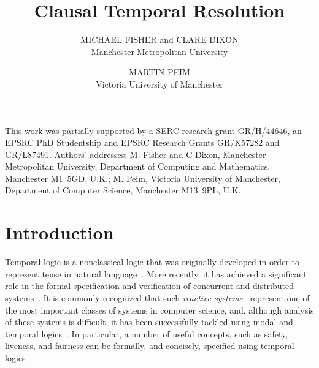 \documentclass[nohyperref]{acmtrans2f}
\title{Clausal Temporal Resolution}
\author{MICHAEL FISHER and CLARE DIXON\\
        Manchester Metropolitan University
        \and
        MARTIN PEIM\\
        Victoria University of Manchester}
\begin{document}
\begin{bottomstuff}
This  work was  partially supported by a SERC research grant GR/H/44646, an
EPSRC PhD Studentship and EPSRC Research Grants GR/K57282 and GR/L87491.\newline
%
Authors' addresses: M. Fisher and C Dixon,
Manchester Metropolitan University,
Department of Computing and Mathematics, Manchester M1~5GD, U.K.;
M. Peim, Victoria University of Manchester,
Department of Computer Science, Manchester M13~9PL, U.K.\newline
%
%
\end{bottomstuff}

\maketitle

%
\section{Introduction}
\label{intro}
%
Temporal logic is a nonclassical logic that was originally
developed in order to represent tense in natural
language~\cite{Pri67}. More recently, it has achieved a significant
role in the formal specification and verification of concurrent and
distributed systems~\cite{Pnu77}. It is commonly recognized that such
{\em reactive systems}~\cite{HP85} represent one of the most important
classes of systems in computer science, and, although analysis of these
systems is difficult, it has been successfully tackled using modal and temporal
logics~\cite{Pnu77,emerson:90a,Stir92}.  In particular, a number of
useful concepts, such as safety, liveness, and fairness can be
formally, and concisely, specified using temporal
logics~\cite{MannaPnueli92:book,emerson:90a}.
\end{document}
